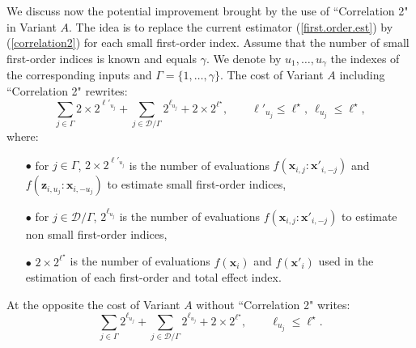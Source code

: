 \documentclass[]{elsarticle}
\theoremstyle{definition}
\newcommand{\bvec}[1]{\boldsymbol{#1}}
\newcommand{\vx}{\bvec{x}}
\newcommand{\vz}{\bvec{z}}
\begin{document}
We discuss now the potential improvement brought by the use of ``Correlation 2" in Variant $A$. The idea is to replace the current estimator (\ref{first.order.est}) by (\ref{correlation2}) for each small first-order index. Assume that the number of small first-order indices is known and equals $\gamma$. We denote by $u_1,\dots,u_{\gamma}$ the indexes of the corresponding inputs and $\Gamma = \{1,\dots,\gamma\}$. The cost of Variant $A$ including ``Correlation 2" rewrites: 
\begin{equation}
\sum \limits_{j \in \Gamma} 2 \times 2^{\ell'_{u_j}} + \sum \limits_{j \in \mathcal{D}/\Gamma} 2^{\ell_{u_j}} + 2 \times 2^{\ell^\star}, \qquad \ell'_{u_j}\leq \ell^{\star}, \ \ell_{u_j} \leq \ell^{\star},
\label{cost.improvement}
\end{equation}
where: \begin{itemize}
\item[$\bullet$] for $j\in \Gamma$, $2 \times 2^{\ell'_{u_j}}$ is the number of evaluations $f\left(\vx_{i,j}:{\vx'}_{i,-j}\right)$ and $f\left(\vz_{i,u_j}:\vx_{i,-u_j}\right)$ to estimate small first-order indices,
\item[$\bullet$] for $j\in \mathcal{D}/\Gamma$, $ 2^{\ell_{u_j}}$ is the number of evaluations $f\left(\vx_{i,j}:{\vx'}_{i,-j}\right)$ to estimate non small first-order indices,
\item[$\bullet$] $2 \times 2^{\ell^{\star}}$ is the number of evaluations $f\left(\vx_{i}\right)$ and $f\left({\vx'}_{i}\right)$ used in the estimation of each first-order and total effect index.
\end{itemize}
At the opposite the cost of Variant $A$ without  ``Correlation 2" writes:
\begin{equation}
\sum \limits_{j \in \Gamma} 2^{\ell_{u_j}} + \sum \limits_{j \in \mathcal{D}/\Gamma} 2^{\ell_{u_j}} + 2 \times 2^{\ell^{\star}}, \qquad \ell_{u_j} \leq \ell^{\star}.
\label{cost.non.improvement}
\end{equation}
\end{document}
